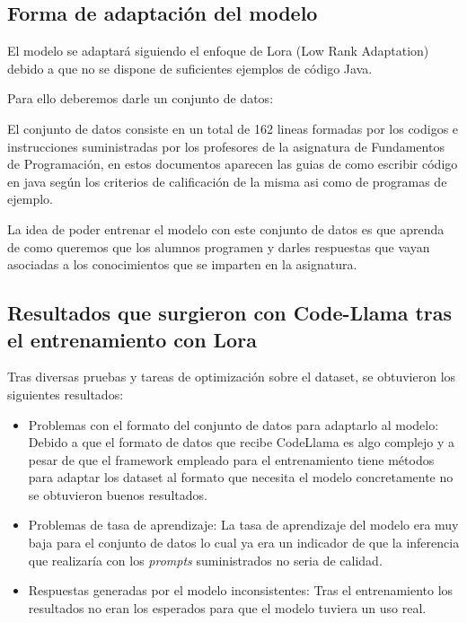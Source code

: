 \subsection{Forma de adaptación del modelo}

El modelo se adaptará siguiendo el enfoque de Lora (Low Rank Adaptation) debido a que no se dispone de suficientes ejemplos de código Java.

Para ello deberemos darle un conjunto de datos:

El conjunto de datos consiste en un total de 162 lineas formadas por los codigos  e instrucciones suministradas por los profesores de la asignatura de Fundamentos de Programación, en estos documentos aparecen las guias de como escribir código en java según los criterios de calificación de la misma asi como de programas de ejemplo.

La idea de poder entrenar el modelo con este conjunto de datos es que aprenda de como queremos que los alumnos programen y darles respuestas que vayan asociadas a los conocimientos que se imparten en la asignatura.

\subsection{Resultados que surgieron con Code-Llama tras el entrenamiento con Lora}

Tras diversas pruebas y tareas de optimización sobre el dataset, se obtuvieron los siguientes resultados:

\begin{itemize}
    \item Problemas con el formato del conjunto de datos para adaptarlo al modelo: Debido a que el formato de datos que recibe CodeLlama es algo complejo y  a pesar de que el framework empleado para el entrenamiento tiene métodos para adaptar los dataset al formato que necesita el modelo concretamente no se obtuvieron buenos resultados.\cite{formatoLlama2}

    \item Problemas de tasa de aprendizaje: La tasa de aprendizaje del modelo era muy baja para el conjunto de datos lo cual ya era un indicador de que la inferencia que realizaría con los \textit{prompts} suministrados no seria de calidad.

    \item Respuestas generadas por el modelo inconsistentes: Tras el entrenamiento los resultados no eran los esperados para que el modelo tuviera un uso real.
\end{itemize}


